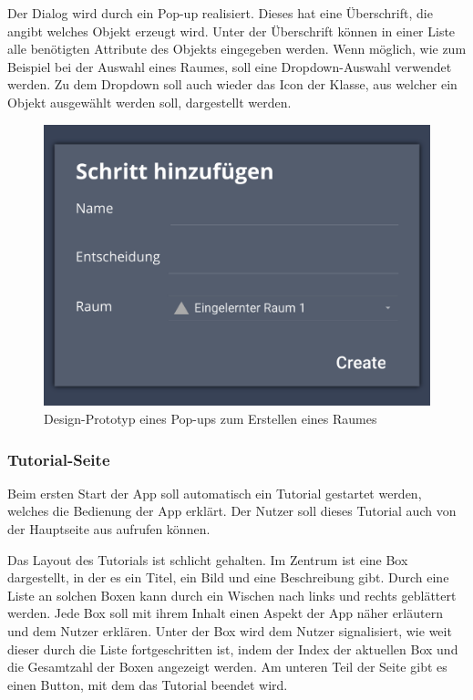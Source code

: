 Der Dialog wird durch ein Pop-up realisiert.
Dieses hat eine Überschrift, die angibt welches Objekt erzeugt wird.
Unter der Überschrift können in einer Liste alle benötigten Attribute des Objekts eingegeben werden.
Wenn möglich, wie zum Beispiel bei der Auswahl eines Raumes, soll eine Dropdown-Auswahl verwendet werden.
Zu dem Dropdown soll auch wieder das Icon der Klasse, aus welcher ein Objekt ausgewählt werden soll, dargestellt werden.

\begin{figure}[h!tbp]
	\includegraphics[width=.5\textwidth]{images/ui-prototype/popup.png}
	\centering
	\caption{Design-Prototyp eines Pop-ups zum Erstellen eines Raumes}
	\label{fig:ui-popup}
\end{figure}

\subsubsection{Tutorial-Seite} \label{sec:app-tutorial}

Beim ersten Start der App soll automatisch ein Tutorial gestartet werden, welches die Bedienung der App erklärt.
Der Nutzer soll dieses Tutorial auch von der Hauptseite aus aufrufen können.

Das Layout des Tutorials ist schlicht gehalten.
Im Zentrum ist eine Box dargestellt, in der es ein Titel, ein Bild und eine Beschreibung gibt.
Durch eine Liste an solchen Boxen kann durch ein Wischen nach links und rechts geblättert werden.
Jede Box soll mit ihrem Inhalt einen Aspekt der App näher erläutern und dem Nutzer erklären.
Unter der Box wird dem Nutzer signalisiert, wie weit dieser durch die Liste fortgeschritten ist,
indem der Index der aktuellen Box und die Gesamtzahl der Boxen angezeigt werden.
Am unteren Teil der Seite gibt es einen Button, mit dem das Tutorial beendet wird.


